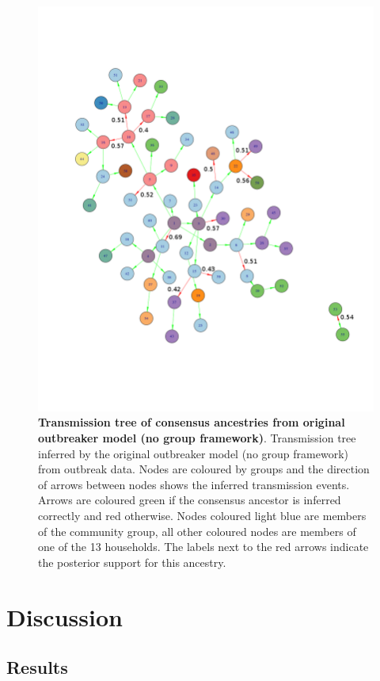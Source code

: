 \documentclass[11pt,a4paper]{report}
\begin{document}
\begin{figure}[h!]
\centering
\includegraphics[scale=0.4]{tree_no_grps.png} \newline
\caption{{\bf Transmission tree of consensus ancestries from original outbreaker model (no group framework)}. Transmission tree inferred by the original outbreaker model (no group framework) from outbreak data. Nodes are coloured by groups and the direction of arrows between nodes shows the inferred transmission events. Arrows are coloured green if the consensus ancestor is inferred correctly and red otherwise. Nodes coloured light blue are members of the community group, all other coloured nodes are members of one of the 13 households. The labels next to the red arrows indicate the posterior support for this ancestry.}
\end{figure}



\chapter{Discussion}
\section{Results}
\end{document}

